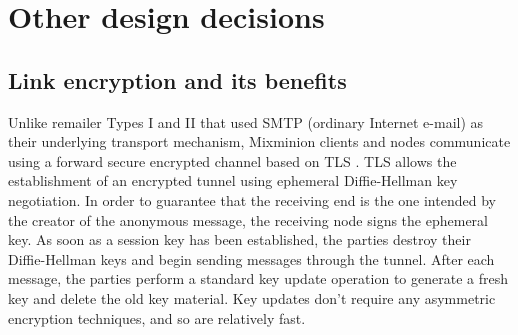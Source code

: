 \documentclass[11pt]{IEEEtran}
\begin{document}
\section{Other design decisions}


\subsection{Link encryption and its benefits}
\label{subsec:link-encrypt}

Unlike remailer Types I and II that used SMTP \cite{SMTP} (ordinary
Internet e-mail) as their underlying transport mechanism, Mixminion
clients and nodes communicate using a forward secure encrypted channel
based on TLS \cite{TLS}.  
TLS allows the establishment of an encrypted tunnel using ephemeral
Diffie-Hellman key negotiation. In order to guarantee that the receiving end is
the one intended by the creator of the anonymous message, the
receiving node signs the ephemeral key. As soon as a session key
has been established, the parties destroy their Diffie-Hellman keys
and begin sending messages through the tunnel. After each message, the
parties perform a standard key update operation to generate a fresh
key and delete the old key material.  Key updates don't require any
asymmetric encryption techniques, and so are relatively fast.

%


%
\end{document}
